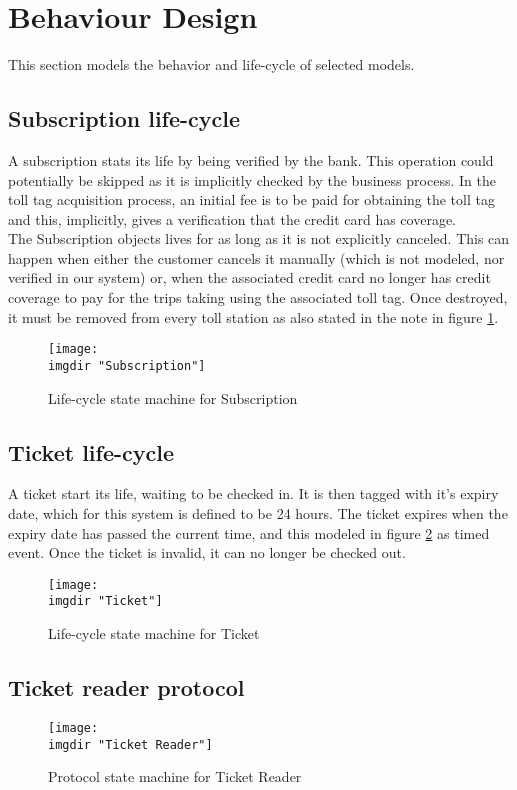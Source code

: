 \section{Behaviour Design}
This section models the behavior and life-cycle of selected models.

\subsection{Subscription life-cycle}
A subscription stats its life by being verified by the bank. This operation could potentially be skipped as it is implicitly checked by the business process. In the toll tag acquisition process, an initial fee is to be paid for obtaining the toll tag and this, implicitly, gives a verification that the credit card has coverage.\\
The Subscription objects lives for as long as it is not explicitly canceled. This can happen when either the customer cancels it manually (which is not modeled, nor verified in our system) or, when the associated credit card no longer has credit coverage to pay for the trips taking using the associated toll tag. Once destroyed, it must be removed from every toll station as also stated in the note in figure \ref{fig:lsm:subscription}.
\begin{figure}
  \centering
  \texttt{[image: \\imgdir "Subscription"]}
  \caption{Life-cycle state machine for Subscription}
  \label{fig:lsm:subscription}
\end{figure}

\subsection{Ticket life-cycle}
A ticket start its life, waiting to be checked in. It is then tagged with it's expiry date, which for this system is defined to be 24 hours. The ticket expires when the expiry date has passed the current time, and this modeled in figure \ref{fig:lsm:ticket} as timed event. Once the ticket is invalid, it can no longer be checked out.
\begin{figure}
  \centering
  \texttt{[image: \\imgdir "Ticket"]}
  \caption{Life-cycle state machine for Ticket}
  \label{fig:lsm:ticket}
\end{figure}

\subsection{Ticket reader protocol}
\begin{figure}
  \centering
  \texttt{[image: \\imgdir "Ticket Reader"]}
  \caption{Protocol state machine for Ticket Reader}
  \label{fig:lsm:ticket_reader}
\end{figure}

